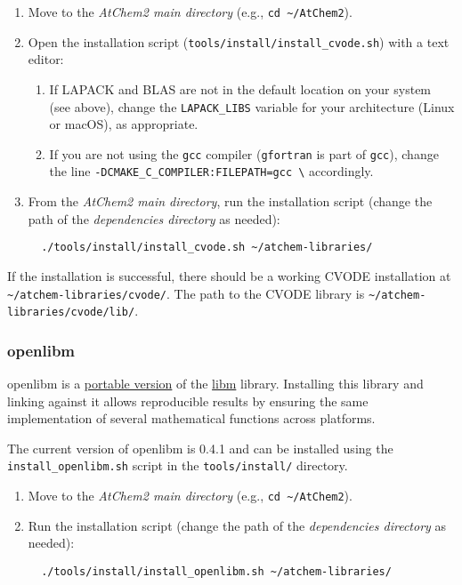 \begin{enumerate}
\item Move to the \emph{AtChem2 main directory} (e.g., \texttt{cd\
    \textasciitilde{}/AtChem2}).
\item Open the installation script
  (\texttt{tools/install/install\_cvode.sh}) with a text editor:

  \begin{enumerate}
  \item If LAPACK and BLAS are not in the default location on your
    system (see above), change the \texttt{LAPACK\_LIBS} variable for
    your architecture (Linux or macOS), as appropriate.
  \item If you are not using the \texttt{gcc} compiler
    (\texttt{gfortran} is part of \texttt{gcc}), change the line
    \texttt{-DCMAKE\_C\_COMPILER:FILEPATH=gcc\ \textbackslash{}}
    accordingly.
  \end{enumerate}
\item From the \emph{AtChem2 main directory}, run the installation
  script (change the path of the \emph{dependencies directory} as
  needed):
\begin{verbatim}
  ./tools/install/install_cvode.sh ~/atchem-libraries/
\end{verbatim}
\end{enumerate}

If the installation is successful, there should be a working CVODE
installation at
\texttt{\textasciitilde{}/atchem-libraries/cvode/}. The path to the
CVODE library is
\texttt{\textasciitilde{}/atchem-libraries/cvode/lib/}.

\subsubsection{openlibm} \label{openlibm}

openlibm is a \href{http://openlibm.org/}{portable version} of the
\href{https://en.wikipedia.org/wiki/C_mathematical_functions}{libm}
library. Installing this library and linking against it allows
reproducible results by ensuring the same implementation of several
mathematical functions across platforms.

The current version of openlibm is 0.4.1 and can be installed using
the \texttt{install\_openlibm.sh} script in the
\texttt{tools/install/} directory.

\begin{enumerate}
\item Move to the \emph{AtChem2 main directory} (e.g., \texttt{cd\
    \textasciitilde{}/AtChem2}).
\item Run the installation script (change the path of the
  \emph{dependencies directory} as needed):
\begin{verbatim}
  ./tools/install/install_openlibm.sh ~/atchem-libraries/
\end{verbatim}
\end{enumerate}


